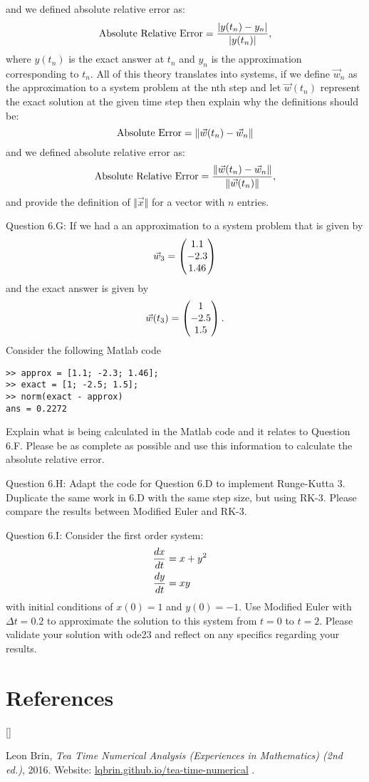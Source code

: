 \documentclass{article}
\def\beginrefs{\begin{list}%
        {[\arabic{equation}]}{\usecounter{equation}
         \setlength{\leftmargin}{2.0truecm}\setlength{\labelsep}{0.4truecm}%
         \setlength{\labelwidth}{1.6truecm}}}
\def\endrefs{\end{list}}
\def\bibentry#1{\item[\hbox{[#1]}]}
\def\ds{\displaystyle}
\begin{document}
and we defined absolute relative error as:
$${\rm Absolute \ Relative \ Error} =  \frac {\vert y(t_n)-y_n\vert}{\vert y(t_n)\vert},$$
where $\ds y(t_n)$ is the exact answer at $\ds t_n$ and $\ds y_n$ is the approximation corresponding to $\ds t_n$. All of this theory translates into systems, if we define $\ds \vec w_n$ as the approximation to a system problem at the nth step and let $\ds \vec w(t_n)$ represent the exact solution at the given time step then explain why the definitions should be:
$${\rm Absolute \ Error}=\Vert \vec w(t_n)-\vec w_n\Vert$$
and we defined absolute relative error as:
$${\rm Absolute \ Relative \ Error} =  \frac {\Vert \vec w(t_n)-\vec w_n\Vert}{\Vert \vec w(t_n)\Vert},$$
and provide the definition of $\ds \Vert \vec x \Vert$ for a vector with $n$ entries. 
\par \medskip \noindent 
%
Question 6.G: If we had a an approximation to a system problem that is given by
$$\vec w_3 = \begin{pmatrix} 1.1 \cr -2.3 \cr 1.46 \end{pmatrix}$$
and the exact answer is given by
$$\vec w(t_3) = \begin{pmatrix} 1 \cr -2.5 \cr 1.5 \end{pmatrix}.$$
Consider the following Matlab code
\begin{verbatim}
>> approx = [1.1; -2.3; 1.46];
>> exact = [1; -2.5; 1.5];
>> norm(exact - approx)
ans = 0.2272    
\end{verbatim}
Explain what is being calculated in the Matlab code and it relates to Question 6.F. Please be as complete as possible and use this information to calculate the absolute relative error. \par \medskip \noindent 
%
%
Question 6.H: Adapt the code for Question 6.D to implement Runge-Kutta 3. Duplicate the same work in 6.D with the same step size, but using RK-3. Please compare the results between Modified Euler and RK-3.  
\par \medskip \noindent 
%
Question 6.I: Consider the first order system:
\begin{align*}
    \frac {dx}{dt} &= x+y^2  \cr 
    \frac {dy}{dt} &= xy
\end{align*}
with initial conditions of $x(0)=1$ and $y(0)=-1$. Use Modified Euler with $\Delta t = 0.2$ to approximate the solution to this system from $t=0$ to $t=2$. Please validate your solution with ode23 and reflect on any specifics regarding your results. 
\par \bigskip \par


\section*{References}
\beginrefs


\bibentry{LB16}{\sc Leon Brin},
{\it Tea Time Numerical Analysis (Experiences in Mathematics)  (2nd ed.)}, 2016. Website: \href{http://lqbrin.github.io/tea-time-numerical/}{lqbrin.github.io/tea-time-numerical} .

\endrefs
\end{document}
